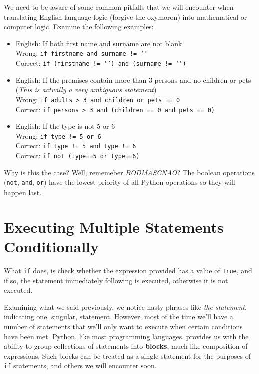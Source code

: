We need to be aware of some common pitfalls that we will encounter   when translating English language logic (forgive the oxymoron) into   mathematical or computer logic. Examine the following examples:
\begin{itemize}
	\item English: If both first name and surname are not blank
\\     Wrong: \texttt{if firstname and surname != `'}    
\\     Correct: \texttt{if (firstname != `') and (surname != `')}   
	\item English: If the premises contain more than 3 persons and no    children or pets (\textit{This is actually a very ambiguous statement})
\\     Wrong: \texttt{if adults > 3 and children or pets == 0}    
\\     Correct: \texttt{if persons > 3 and (children == 0 and pets == 0)}    
	\item English: If the type is not 5 or 6
\\     Wrong: \texttt{if type != 5 or 6}    
\\     Correct: \texttt{if type != 5 and type != 6}
\\     Correct: \texttt{if not (type==5 or type==6)}     
\end{itemize}

Why is this the case? Well, rememeber \textit{BODMASCNAO}? The boolean operations (\texttt{not}, \texttt{and}, \texttt{or}) have the lowest priority of all Python operations so they                 will happen last.

\section{Executing Multiple Statements Conditionally}     What \texttt{if} does, is check whether the expression provided has a    value of \texttt{True}, and if so, the statement immediately    following is executed, otherwise it is not executed.    

Examining what we said previously, we notice nasty phrases like \textit{the   statement}, indicating one, singular, statement. However, most of the   time we'll have a number of statements that we'll only want to execute when certain   conditions have been met. Python, like most programming languages,   provides us with the ability to group collections of statements into   \textbf{blocks}, much like composition of expressions. Such   blocks can be treated as a single statement for the purposes of \texttt{if}   statements, and others we will encounter soon.

